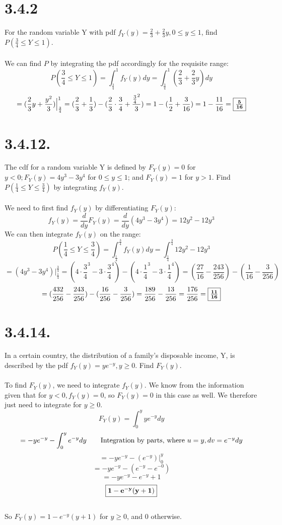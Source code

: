 \documentclass{article}
\begin{document}
\thispagestyle{firstpageheader}
{\Large 

\section*{3.4.2} 
For the random variable Y with pdf \(f_Y (y) = \frac{2}{3} + \frac{2}{3}y, 0 \leq y \leq 1\), find \(P(\frac{3}{4} \leq Y \leq 1)\).
\\
\\
We can find \(P\) by integrating the pdf accordingly for the requisite range: 
\[
P(\frac{3}{4} \leq Y \leq 1) = \int_{\frac{3}{4}}^{1}f_Y(y)dy = \int_{\frac{3}{4}}^{1} (\frac{2}{3} + \frac{2}{3}y) dy
\]
\[
= (\frac{2}{3}y + \frac{y^2}{3}) \Big|_{\frac{3}{4}}^{1} = (\frac{2}{3} + \frac{1}{3}) - (\frac{2}{3} \cdot \frac{3}{4} + \frac{\frac{3}{4}^2}{3}) = 1 - (\frac{1}{2} + \frac{3}{16}) = 1 - \frac{11}{16} = \fbox{\(\mathbf{\frac{5}{16}}\)} 
\]

\section*{3.4.12.} 
The cdf for a random variable Y is defined by \(F_Y (y) = 0\) for \(y < 0; F_Y (y) = 4y^3 - 3y^4\) for \(0 \leq y \leq 1\); and \(F_Y (y) = 1\) for \(y > 1\). Find \(P(\frac{1}{4} \leq Y \leq \frac{3}{4})\) by integrating \(f_Y (y)\).
\\
\\
We need to first find \(f_Y(y)\) by differentiating \(F_Y(y)\):
\[
f_Y(y) = \frac{d}{dy}F_Y(y) = \frac{d}{dy} (4y^3 -3y^4) = 12y^2 - 12y^3
\]
We can then integrate \(f_Y(y)\) on the range:
\[
P(\frac{1}{4} \leq Y \leq \frac{3}{4}) = \int_{\frac{1}{4}}^{\frac{3}{4}}f_Y(y)dy = \int_{\frac{1}{4}}^{\frac{3}{4}} 12y^2 - 12y^3
\]
\[
= (4y^3 - 3y^4) \Big|_{\frac{1}{4}}^{\frac{3}{4}} = (4 \cdot \frac{3}{4}^3 - 3 \cdot \frac{3}{4}^4) - (4 \cdot \frac{1}{4}^3 - 3 \cdot \frac{1}{4}^4) = (\frac{27}{16} - \frac{243}{256}) - (\frac{1}{16} - \frac{3}{256})
\]
\[
= (\frac{432}{256} - \frac{243}{256}) - (\frac{16}{256} - \frac{3}{256})= \frac{189}{256} - \frac{13}{256} = \frac{176}{256} = \fbox{\(\mathbf{\frac{11}{16}}\)}
\]

\section*{3.4.14.} 
In a certain country, the distribution of a family's disposable income, Y, is described by the pdf \(f_Y (y) = ye^{-y}, y \geq 0\). Find \(F_Y (y)\).
\\
\\
To find \(F_Y(y)\), we need to integrate \(f_Y(y)\). We know from the information given that for \(y < 0, f_Y(y) = 0\), so \(F_Y(y) = 0\) in this case as well. We therefore just need to integrate for \(y \geq 0\).
\[
F_Y(y) = \int_{0}^{y} ye^{-y}dy
\] 
\[
= -ye^{-y} - \int_{0}^{y} e^{-y}dy
\tag*{Integration by parts, where \(u = y, dv = e^{-y}dy\)}
\]
\[
= -ye^{-y} - (e^{-y}) \Big|_{0}^{y}
\]
\[
= -ye^{-y} - (e^{-y} - e^{-0})
\]
\[
= -ye^{-y} - e^{-y} + 1
\]
\[
\fbox{\(\mathbf{1 - e^{-y}(y + 1)}\)}
\]
\\
So \(F_Y(y) = 1 - e^{-y}(y + 1)\) for \(y \geq 0\), and 0 otherwise.

}
\end{document}
